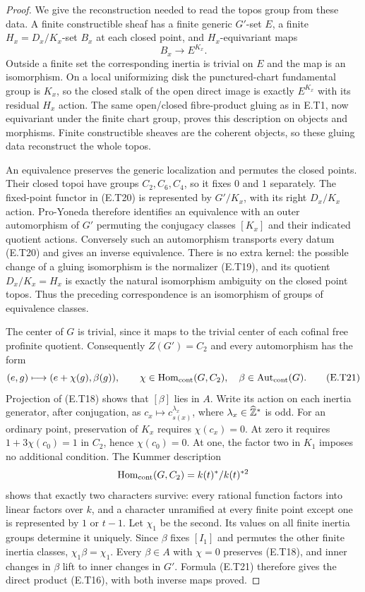 \begin{proof}
We give the reconstruction needed to read the topos group
from these data.  A finite constructible sheaf has a
finite generic $G'$-set $E$, a finite $H_x=D_x/K_x$-set
$B_x$ at each closed point, and $H_x$-equivariant maps
\[
                       B_x\longrightarrow E^{K_x}.
 \tag{E.T20}
\]
Outside a finite set the corresponding inertia is trivial
on $E$ and the map is an isomorphism.  On a local
uniformizing disk the punctured-chart fundamental group
is $K_x$, so the closed stalk of the open direct image
is exactly $E^{K_x}$ with its residual $H_x$ action.
The same open/closed fibre-product gluing as in E.T1,
now equivariant under the finite chart group, proves
this description on objects and morphisms.  Finite
constructible sheaves are the coherent objects, so
these gluing data reconstruct the whole topos.

An equivalence preserves the generic localization and
permutes the closed points.  Their closed topoi have
groups $C_2,C_6,C_4$, so it fixes $0$ and $1$ separately.
The fixed-point functor in (E.T20) is represented by
$G'/K_x$, with its right $D_x/K_x$ action.  Pro-Yoneda
therefore identifies an equivalence with an outer
automorphism of $G'$ permuting the conjugacy classes
$[K_x]$ and their indicated quotient actions.
Conversely such an automorphism transports every datum
(E.T20) and gives an inverse equivalence.
There is no extra kernel: the possible change of a
gluing isomorphism is the normalizer (E.T19), and its
quotient $D_x/K_x=H_x$ is exactly the natural
isomorphism ambiguity on the closed point topos.
Thus the preceding correspondence is an isomorphism
of groups of equivalence classes.

The center of $G$ is trivial, since it maps to the
trivial center of each cofinal free profinite quotient.
Consequently $Z(G')=C_2$ and every automorphism has the
form
\[
 (e,g)\longmapsto(e+\chi(g),\beta(g)),
 \qquad \chi\in\operatorname{Hom}_{\mathrm{cont}}(G,C_2),
 \quad \beta\in\operatorname{Aut}_{\mathrm{cont}}(G).
 \tag{E.T21}
\]
Projection of (E.T18) shows that $[\beta]$ lies in $A$.
Write its action on each inertia generator, after
conjugation, as $c_x\mapsto c_{s(x)}^{\lambda_x}$,
where $\lambda_x\in\widehat{\mathbb Z}^*$ is odd.  For an
ordinary point, preservation of $K_x$ requires
$\chi(c_x)=0$.  At zero it requires
$1+3\chi(c_0)=1$ in $C_2$, hence $\chi(c_0)=0$.
At one, the factor two in $K_1$ imposes no additional
condition.  The Kummer description
\[
 \operatorname{Hom}_{\mathrm{cont}}(G,C_2)=k(t)^*/k(t)^{*2}
\]
shows that exactly two characters survive: every rational
function factors into linear factors over $k$, and a
character unramified at every finite point except one
is represented by $1$ or $t-1$.  Let $\chi_1$ be the
second.  Its values on all finite inertia groups determine
it uniquely.  Since $\beta$ fixes $[I_1]$ and permutes
the other finite inertia classes, $\chi_1\beta=\chi_1$.
Every $\beta\in A$ with $\chi=0$ preserves (E.T18),
and inner changes in $\beta$ lift to inner changes in
$G'$.  Formula (E.T21) therefore gives the direct
product (E.T16), with both inverse maps proved.


\end{proof}

